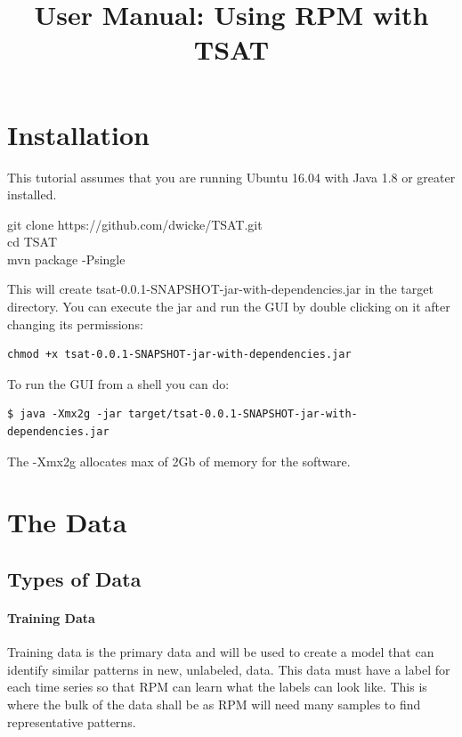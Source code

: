 \documentclass[letterpaper, 12pt]{article}
\newenvironment{allintypewriter}{\ttfamily}{\par}
\begin{document}
\title{User Manual: Using RPM with TSAT}
\maketitle
\tableofcontents
\newpage
\section{Installation}

This tutorial assumes that you are running Ubuntu 16.04 with Java 1.8 or greater installed.

\begin{allintypewriter}
	\noindent git clone https://github.com/dwicke/TSAT.git\\
	cd TSAT\\
	mvn package -Psingle\\
\end{allintypewriter}
This will create tsat-0.0.1-SNAPSHOT-jar-with-dependencies.jar in the target directory.  You can execute the jar and run the GUI by double clicking on it after changing its permissions:
\begin{verbatim}
chmod +x tsat-0.0.1-SNAPSHOT-jar-with-dependencies.jar
\end{verbatim}  


To run the GUI from a shell you can do:
\begin{verbatim}
$ java -Xmx2g -jar target/tsat-0.0.1-SNAPSHOT-jar-with-dependencies.jar 
\end{verbatim}
	
The -Xmx2g allocates max of 2Gb of memory for the software.


\section{The Data}

\subsection{Types of Data}

\paragraph{Training Data}
Training data is the primary data and will be used to create a model that can identify similar patterns in new, unlabeled, data. This data must have a label for each time series so that RPM can learn what the labels can look like. This is where the bulk of the data shall be as RPM will need many samples to find representative patterns.
\end{document}
